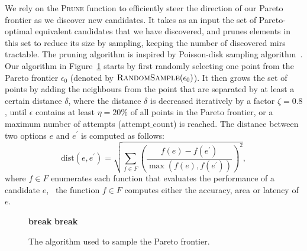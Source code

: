 We rely on the \textsc{Prune} function to efficiently steer the direction
of our Pareto frontier as we discover new candidates.  It takes as an
input the set of Pareto-optimal equivalent candidates that we have
discovered, and prunes elements in this set to reduce its size by sampling,
keeping the number of discovered \glspl{mir} tractable.  The pruning
algorithm is inspired by Poisson-disk sampling algorithm~\cite{bridson07}.
Our algorithm in Figure~\ref{lo:alg:sample} starts by first randomly
selecting one point from the Pareto frontier $\epsilon_0$ (denoted by
$\textsc{RandomSample}(\epsilon_0)$).  It then grows the set of points by
adding the neighbours from the point that are separated by at least a certain
distance $\delta$, where the distance $\delta$ is decreased iteratively by
a factor $\zeta = 0.8$, until $\epsilon$ contains at least $\eta = 20\%$
of all points in the Pareto frontier, or a maximum number of attempts
($\mathrm{attempt\_count}$) is reached.  The distance between two options $e$
and $e^\prime$ is computed as follows:
\begin{equation}
    \mathrm{dist} \left(e, e^\prime\right)
    = \sqrt{
        \sum_{f \in F} {\left(
            \frac{f(e) - f(e^\prime)}{\max(f(e), f(e^\prime))}
        \right)}^2
    },
\end{equation}
where $f \in F$ enumerates each function that evaluates the performance of a
candidate $e$, \ie~the function $f \in F$ computes either the accuracy, area
or latency of $e$.

\begin{figure}[ht]
    \centering
    \begin{algorithmic}
        \singlespacing%
                            \State\textbf{break}
                        \EndIf%
                        \EndIf%
                    \EndFor%
                \EndFor%
                \If{$\left|\epsilon\right| \geq \eta \left|\epsilon_0\right|$}
                    \State\textbf{break}
                \EndIf%
                \State{$\delta = \zeta\delta$}
            \EndFor%
            \State{\Return{$\epsilon$}}
        \EndFunction%
    \end{algorithmic}
    \caption{%
        The algorithm used to sample the Pareto frontier.
    }\label{lo:alg:sample}
\end{figure}

